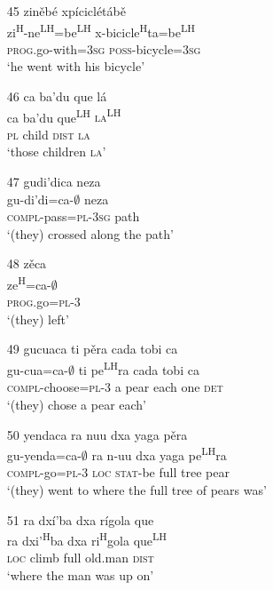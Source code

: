 \begin{itemize}
\item[45]
\glll zin\v{e}b\'{e} xp\'{i}cicl\'{e}t\'{a}b\v{e}\\
zi\textsuperscript{H}-ne\textsuperscript{LH}=be\textsuperscript{LH}  x-bicicle\textsuperscript{H}ta=be\textsuperscript{LH}\\
 \textsc{prog}.go-with=\textsc{3sg} \textsc{poss}-bicycle=\textsc{3sg}\\
\glt `he went with his bicycle'


\item[46]
\glll ca ba'du que l\'{a}\\
ca ba'du que\textsuperscript{LH}  \textsc{la\textsuperscript{LH}}\\
\textsc{pl} child \textsc{dist} \textsc{la}\\
\glt `those children \textsc{la}'


\item[47]
\glll gudi'dica neza\\
gu-di'di=ca-$\emptyset$ neza\\
\textsc{compl}-pass=\textsc{pl}-\textsc{3sg} path\\
\glt `(they) crossed along the path' 


\item[48]
\glll z\v{e}ca\\
 ze\textsuperscript{H}=ca-$\emptyset$\\
\textsc{prog}.go=\textsc{pl}-\textsc{3}\\
\glt `(they) left'


\item[49]
\glll gucuaca ti p\v{e}ra cada tobi ca\\
gu-cua=ca-$\emptyset$ ti pe\textsuperscript{LH}ra cada tobi ca\\
\textsc{compl}-choose=\textsc{pl}-\textsc{3} a pear each one \textsc{det}\\
\glt `(they) chose a pear each'


\item[50]
\glll yendaca ra nuu dxa yaga p\v{e}ra\\
gu-yenda=ca-$\emptyset$ ra n-uu dxa yaga pe\textsuperscript{LH}ra\\
\textsc{compl}-go=\textsc{pl}-\textsc{3} \textsc{loc} \textsc{stat}-be full tree pear\\
\glt `(they) went to where the full tree of pears was'


\item[51]
\glll ra dx\'{i}'ba dxa r\'{i}gola que\\
ra dxi'\textsuperscript{H}ba dxa ri\textsuperscript{H}gola que\textsuperscript{LH}\\
\textsc{loc} climb full old.man \textsc{dist}\\
\glt `where the man was up on'



\end{itemize}
